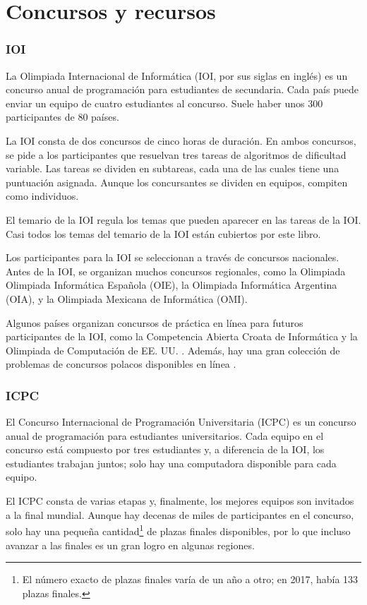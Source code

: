 \section{Concursos y recursos}

\subsubsection{IOI}

La Olimpiada Internacional de Informática (IOI, por sus siglas en inglés)
es un concurso anual de programación para
estudiantes de secundaria.
Cada país puede enviar un equipo de
cuatro estudiantes al concurso.
Suele haber unos 300 participantes
de 80 países.

La IOI consta de dos concursos de cinco horas de duración.
En ambos concursos, se pide a los participantes que
resuelvan tres tareas de algoritmos de dificultad variable.
Las tareas se dividen en subtareas,
cada una de las cuales tiene una puntuación asignada.
Aunque los concursantes se dividen en equipos,
compiten como individuos.

El temario de la IOI \cite{iois} regula los temas
que pueden aparecer en las tareas de la IOI.
Casi todos los temas del temario de la IOI
están cubiertos por este libro.

Los participantes para la IOI se seleccionan a través de
concursos nacionales.
Antes de la IOI, se organizan muchos concursos regionales,
como la Olimpiada Olimpiada Informática Española (OIE),
la Olimpiada Informática Argentina (OIA),
y la Olimpiada Mexicana de Informática (OMI).

Algunos países organizan concursos de práctica en línea
para futuros participantes de la IOI,
como la Competencia Abierta Croata de Informática \cite{coci}
y la Olimpiada de Computación de EE. UU. \cite{usaco}.
Además, hay una gran colección de problemas de concursos polacos
disponibles en línea \cite{main}.

\subsubsection{ICPC}

El Concurso Internacional de Programación Universitaria (ICPC)
es un concurso anual de programación para estudiantes universitarios.
Cada equipo en el concurso está compuesto por tres estudiantes
y, a diferencia de la IOI, los estudiantes trabajan juntos;
solo hay una computadora disponible para cada equipo.

El ICPC consta de varias etapas y, finalmente, los
mejores equipos son invitados a la final mundial.
Aunque hay decenas de miles de participantes
en el concurso, solo hay una pequeña cantidad\footnote{El número exacto de plazas finales varía
de un año a otro; en 2017, había 133 plazas finales.} de plazas finales disponibles,
por lo que incluso avanzar a las finales
es un gran logro en algunas regiones.

